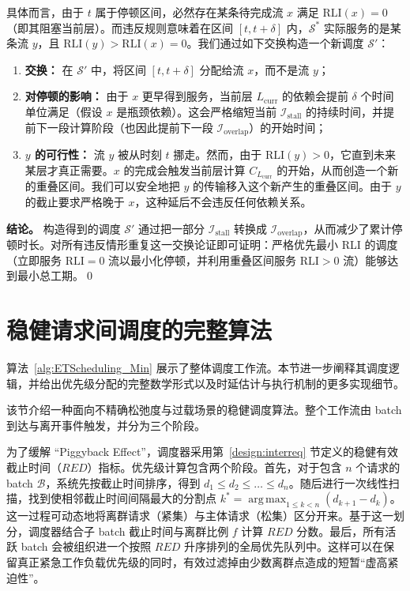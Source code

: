 具体而言，由于 $t$ 属于停顿区间，必然存在某条待完成流 $x$ 满足 $\text{RLI}(x) = 0$（即其阻塞当前层）。而违反规则意味着在区间 $[t, t+\delta]$ 内，$\mathcal{S}^*$ 实际服务的是某条流 $y$，且 $\text{RLI}(y) > \text{RLI}(x) = 0$。我们通过如下交换构造一个新调度 $\mathcal{S}'$：
\begin{enumerate}
\item \textbf{交换：} 在 $\mathcal{S}'$ 中，将区间 $[t, t+\delta]$ 分配给流 $x$，而不是流 $y$；
\item \textbf{对停顿的影响：} 由于 $x$ 更早得到服务，当前层 $L_{\text{curr}}$ 的依赖会提前 $\delta$ 个时间单位满足（假设 $x$ 是瓶颈依赖）。这会严格缩短当前 $\mathcal{I}_{\text{stall}}$ 的持续时间，并提前下一段计算阶段（也因此提前下一段 $\mathcal{I}_{\text{overlap}}$）的开始时间；
\item \textbf{$y$ 的可行性：} 流 $y$ 被从时刻 $t$ 挪走。然而，由于 $\text{RLI}(y) > 0$，它直到未来某层才真正需要。$x$ 的完成会触发当前层计算 $C_{L_{\text{curr}}}$ 的开始，从而创造一个新的重叠区间。我们可以安全地把 $y$ 的传输移入这个新产生的重叠区间。由于 $y$ 的截止要求严格晚于 $x$，这种延后不会违反任何依赖关系。
\end{enumerate}

\textbf{结论。} 构造得到的调度 $\mathcal{S}'$ 通过把一部分 $\mathcal{I}_{\text{stall}}$ 转换成 $\mathcal{I}_{\text{overlap}}$，从而减少了累计停顿时长。对所有违反情形重复这一交换论证即可证明：严格优先最小 RLI 的调度（立即服务 $\text{RLI}=0$ 流以最小化停顿，并利用重叠区间服务 $\text{RLI}>0$ 流）能够达到最小总工期。\qed

\section{稳健请求间调度的完整算法} \label{sec:appendix:fullalg}



算法~\ref{alg:ETScheduling_Min} 展示了整体调度工作流。本节进一步阐释其调度逻辑，并给出优先级分配的完整数学形式以及时延估计与执行机制的更多实现细节。

该节介绍一种面向不精确松弛度与过载场景的稳健调度算法。整个工作流由 batch 到达与离开事件触发，并分为三个阶段。

为了缓解 “Piggyback Effect”，调度器采用第~\ref{design:interreq} 节定义的稳健有效截止时间（$RED$）指标。优先级计算包含两个阶段。首先，对于包含 $n$ 个请求的 batch $\mathcal{B}$，系统先按截止时间排序，得到 $d_1 \le d_2 \le \dots \le d_n$。随后进行一次线性扫描，找到使相邻截止时间间隔最大的分割点 $k^* = \operatorname*{arg\,max}_{1 \le k < n} (d_{k+1} - d_k)$。这一过程可动态地将离群请求（紧集）与主体请求（松集）区分开来。基于这一划分，调度器结合子 batch 截止时间与离群比例 $f$ 计算 $RED$ 分数。最后，所有活跃 batch 会被组织进一个按照 $RED$ 升序排列的全局优先队列中。这样可以在保留真正紧急工作负载优先级的同时，有效过滤掉由少数离群点造成的短暂“虚高紧迫性”。

